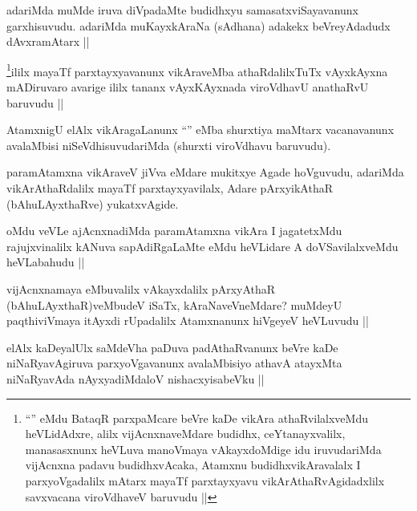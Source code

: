\begin{artha}
adariMda muMde iruva diVpadaMte budidhxyu samasatxviSayavanunx garxhisuvudu. adariMda muKayxkAraNa (sAdhana) adakekx beVreyAdadudx dAvxramAtarx ||
\end{artha}

\begin{artha}
\footnote{``\stext'' eMdu BataqR parxpaMcare beVre kaDe vikAra athaRvilalxveMdu heVLidAdxre, alilx vijAcnxnaveMdare budidhx, ceYtanayxvalilx, manasasxnunx heVLuva manoVmaya vAkayxdoMdige idu iruvudariMda vijAcnxna padavu budidhxvAcaka, Atamxnu budidhxvikAravalalx I parxyoVgadalilx mAtarx mayaTf parxtayxyavu vikArAthaRvAgidadxlilx savxvacana viroVdhaveV baruvudu ||}ililx mayaTf parxtayxyavanunx vikAraveMba athaRdalilxTuTx vAyxkAyxna mADiruvaro avarige ililx tananx vAyxKAyxnada viroVdhavU anathaRvU baruvudu ||
\end{artha}

\begin{artha}
AtamxnigU elAlx vikAragaLanunx ``\stext'' eMba shurxtiya maMtarx vacanavanunx avalaMbisi niSeVdhisuvudariMda (shurxti viroVdhavu baruvudu).
\end{artha}

\begin{artha}
paramAtamxna vikAraveV jiVva eMdare mukitxye Agade hoVguvudu, adariMda vikArAthaRdalilx mayaTf parxtayxyavilalx, Adare pArxyikAthaR (bAhuLAyxthaRve) yukatxvAgide.
\end{artha}

\begin{artha}
oMdu veVLe ajAcnxnadiMda paramAtamxna vikAra I jagatetxMdu rajujxvinalilx kANuva sapAdiRgaLaMte eMdu heVLidare A doVSavilalxveMdu heVLabahudu ||
\end{artha}

\begin{artha}
vijAcnxnamaya eMbuvalilx vAkayxdalilx pArxyAthaR (bAhuLAyxthaR)veMbudeV iSaTx, kAraNaveVneMdare? muMdeyU paqthiviVmaya itAyxdi rUpadalilx Atamxnanunx hiVgeyeV heVLuvudu ||
\end{artha}

\begin{artha}
elAlx kaDeyalUlx saMdeVha paDuva padAthaRvanunx beVre kaDe niNaRyavAgiruva parxyoVgavanunx avalaMbisiyo athavA atayxMta niNaRyavAda nAyxyadiMdaloV nishacxyisabeVku ||
\end{artha}

